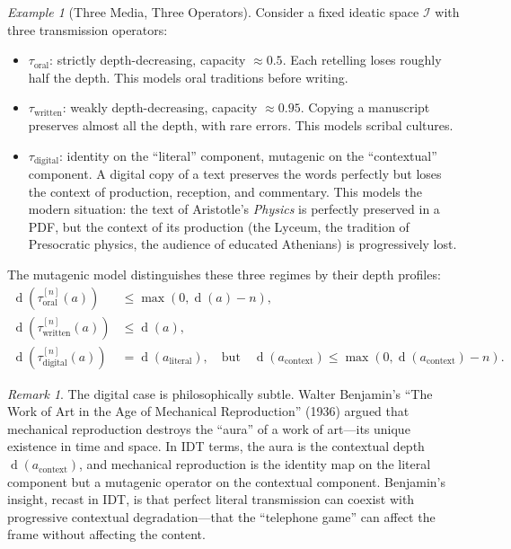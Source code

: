 \documentclass[11pt,openany]{book}
\theoremstyle{definition}
\theoremstyle{plain}
\theoremstyle{remark}
\newtheorem{remark}[axiom]{Remark}
\newtheorem{example}[axiom]{Example}
\newcommand{\IS}{\mathcal{I}}               %
\newcommand{\depth}{\operatorname{d}}       %
\newcommand{\transmit}{\tau}                 %
\begin{document}
\begin{example}[Three Media, Three Operators]
Consider a fixed ideatic space $\IS$ with three transmission operators:
\begin{itemize}
\item $\transmit_\text{oral}$: strictly depth-decreasing, capacity $\approx 0.5$. Each retelling loses roughly half the depth. This models oral traditions before writing.
\item $\transmit_\text{written}$: weakly depth-decreasing, capacity $\approx 0.95$. Copying a manuscript preserves almost all the depth, with rare errors. This models scribal cultures.
\item $\transmit_\text{digital}$: identity on the ``literal'' component, mutagenic on the ``contextual'' component. A digital copy of a text preserves the words perfectly but loses the context of production, reception, and commentary. This models the modern situation: the text of Aristotle's \emph{Physics} is perfectly preserved in a PDF, but the context of its production (the Lyceum, the tradition of Presocratic physics, the audience of educated Athenians) is progressively lost.
\end{itemize}

The mutagenic model distinguishes these three regimes by their depth profiles:
\begin{align*}
\depth(\transmit_\text{oral}^{[n]}(a)) &\leq \max(0, \depth(a) - n), \\
\depth(\transmit_\text{written}^{[n]}(a)) &\leq \depth(a), \\
\depth(\transmit_\text{digital}^{[n]}(a)) &= \depth(a_\text{literal}), \quad \text{but} \quad \depth(a_\text{context}) \leq \max(0, \depth(a_\text{context}) - n).
\end{align*}
\end{example}

\begin{remark}
The digital case is philosophically subtle. Walter Benjamin's ``The Work of Art in the Age of Mechanical Reproduction'' (1936) argued that mechanical reproduction destroys the ``aura'' of a work of art---its unique existence in time and space. In IDT terms, the aura is the contextual depth $\depth(a_\text{context})$, and mechanical reproduction is the identity map on the literal component but a mutagenic operator on the contextual component. Benjamin's insight, recast in IDT, is that perfect literal transmission can coexist with progressive contextual degradation---that the ``telephone game'' can affect the frame without affecting the content.
\end{remark}
\end{document}
